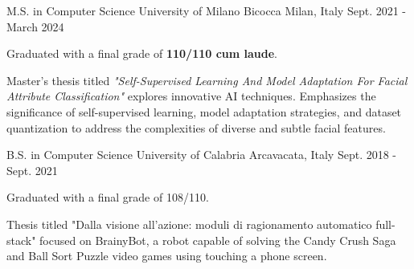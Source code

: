 

\begin{cventries}

\cventry
    {M.S. in Computer Science} %
    {University of Milano Bicocca} %
    {Milan, Italy} %
    {Sept. 2021 - March 2024} %
    {
      \begin{cvitems} %
        \item Graduated with a final grade of \textbf{110/110 cum laude}.
        \item Master's thesis titled \textit{"Self-Supervised Learning And Model Adaptation For Facial Attribute Classification" } explores innovative AI techniques. Emphasizes the significance of self-supervised learning, model adaptation strategies, and dataset quantization to address the complexities of diverse and subtle facial features.
      \end{cvitems}
    }
    
  \cventry
    {B.S. in Computer Science} %
    {University of Calabria} %
    {Arcavacata, Italy} %
    {Sept. 2018 - Sept. 2021} %
    {
      \begin{cvitems} %
        \item Graduated with a final grade of 108/110.
        \item Thesis titled "Dalla visione all’azione: moduli di ragionamento automatico full-stack" focused on BrainyBot, a robot capable of solving the Candy Crush Saga and Ball Sort Puzzle video games using touching a phone screen.
      \end{cvitems}
    }
    


\end{cventries}
